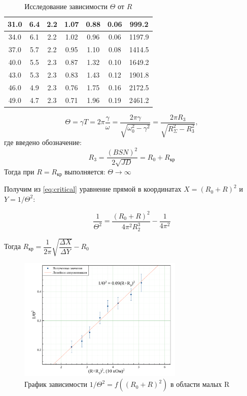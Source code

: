 \documentclass[a4paper, 12pt]{article}
\begin{document}
\begin{table}[H]
\begin{tabular}{|c|c|c|c|c|c|c|}
31.0             & 6.4   & 2.2       & 1.07     & 0.88         & 0.06                  & 999.2                   \\ \hline
34.0             & 6.1   & 2.2       & 1.02     & 0.96         & 0.06                  & 1197.9                  \\ \hline
37.0             & 5.7   & 2.2       & 0.95     & 1.10         & 0.08                  & 1414.5                  \\ \hline
40.0             & 5.5   & 2.3       & 0.87     & 1.32         & 0.10                  & 1649.2                  \\ \hline
43.0             & 5.3   & 2.3       & 0.83     & 1.43         & 0.12                  & 1901.8                  \\ \hline
46.0             & 4.9   & 2.3       & 0.76     & 1.75         & 0.16                  & 2172.5                  \\ \hline
49.0             & 4.7   & 2.3       & 0.71     & 1.96         & 0.19                  & 2461.2                  \\ \hline
\end{tabular}
\caption{Исследование зависимости $\Theta$ от $R$}
\end{table}

\begin{equation}
\Theta = \gamma T = 2 \pi \dfrac{\gamma}{\omega} = \dfrac{2 \pi \gamma}{\sqrt{\omega_0^2 - \gamma^2}} = \dfrac{2 \pi R_3}{\sqrt{R_\Sigma^2 - R_3^2}},
\label{eq:critical}
\end{equation}
где введено обозначение:
$$R_3 = \frac{(BSN)^2}{2\sqrt{JD}} = R_0 + R_\text{кр}$$
Тогда при $R = R_\text{кр}$  выполняется: $\Theta \rightarrow \infty$

Получим из \ref{eq:critical} уравнение прямой в координатах $X = (R_0 + R)^2$ и $Y = 1/\Theta^2$:

$$\dfrac{1}{\Theta^2} = \dfrac{(R_0 + R)^2}{4 \pi^2 R_2^3} - \dfrac{1}{4 \pi^2}$$

Тогда $R_\text{кр} = \dfrac{1}{2 \pi} \sqrt{\dfrac{\Delta X}{\Delta Y}} - R_0$

\begin {figure}[H]
	\begin{center}
\includegraphics[width = 0.7\textwidth]{GraphB}
		\caption{График зависимости $1/\Theta^2 = f((R_0 + R)^2)$ в области малых R}
	\end{center}
\end {figure}
\end{document}
